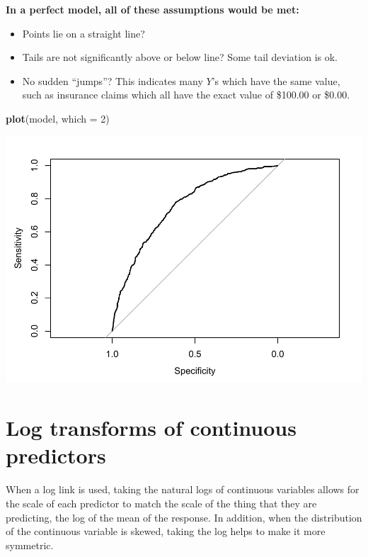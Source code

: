 \documentclass[
  openany]{book}
\newenvironment{Shaded}{\begin{snugshade}}{\end{snugshade}}
\newcommand{\DataTypeTok}[1]{\textcolor[rgb]{0.13,0.29,0.53}{#1}}
\newcommand{\DecValTok}[1]{\textcolor[rgb]{0.00,0.00,0.81}{#1}}
\newcommand{\KeywordTok}[1]{\textcolor[rgb]{0.13,0.29,0.53}{\textbf{#1}}}
\newcommand{\NormalTok}[1]{#1}
\providecommand{\tightlist}{%
  \setlength{\itemsep}{0pt}\setlength{\parskip}{0pt}}
\begin{document}
\textbf{In a perfect model, all of these assumptions would be met:}

\begin{itemize}
\tightlist
\item
  Points lie on a straight line?\\
\item
  Tails are not significantly above or below line? Some tail deviation is ok.
\item
  No sudden ``jumps''? This indicates many \(Y\)'s which have the same value, such as insurance claims which all have the exact value of \$100.00 or \$0.00.
\end{itemize}

\begin{Shaded}
\begin{Highlighting}[]
\KeywordTok{plot}\NormalTok{(model, }\DataTypeTok{which =} \DecValTok{2}\NormalTok{)}
\end{Highlighting}
\end{Shaded}

\includegraphics{05-linear-models_files/figure-latex/unnamed-chunk-39-1.pdf}

\hypertarget{log-transforms-of-continuous-predictors}{%
\section{Log transforms of continuous predictors}\label{log-transforms-of-continuous-predictors}}

When a log link is used, taking the natural logs of continuous variables allows for the scale of each predictor to match the scale of the thing that they are predicting, the log of the mean of the response. In addition, when the distribution of the continuous variable is skewed, taking the log helps to make it more symmetric.
\end{document}
